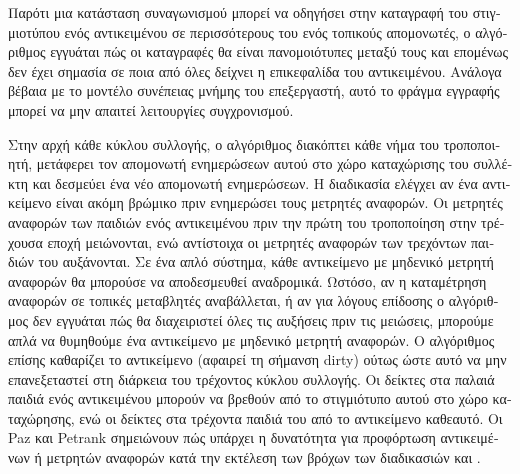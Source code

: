 \begin{greek}
Παρότι μια κατάσταση συναγωνισμού μπορεί να οδηγήσει στην
καταγραφή του στιγμιοτύπου ενός αντικειμένου σε περισσότερους
του ενός τοπικούς απομονωτές, ο αλγόριθμος εγγυάται πώς οι
καταγραφές θα είναι πανομοιότυπες μεταξύ τους και επομένως
δεν έχει σημασία σε ποια από όλες δείχνει η επικεφαλίδα του
αντικειμένου. Ανάλογα βέβαια με το μοντέλο συνέπειας μνήμης
του επεξεργαστή, αυτό το φράγμα εγγραφής μπορεί να μην απαιτεί
λειτουργίες συγχρονισμού.

Στην αρχή κάθε κύκλου συλλογής, ο αλγόριθμος διακόπτει κάθε
νήμα του τροποποιητή, μετάφερει τον απομονωτή ενημερώσεων
αυτού στο χώρο καταχώρισης του συλλέκτη και δεσμεύει ένα νέο
απομονωτή ενημερώσεων. Η διαδικασία 
ελέγχει αν ένα αντικείμενο είναι ακόμη βρώμικο πριν ενημερώσει
τους μετρητές αναφορών. Οι μετρητές αναφορών των παιδιών ενός
αντικειμένου πριν την πρώτη του τροποποίηση στην τρέχουσα
εποχή μειώνονται, ενώ αντίστοιχα οι μετρητές αναφορών των
τρεχόντων παιδιών του αυξάνονται. Σε ένα απλό σύστημα, κάθε
αντικείμενο με μηδενικό μετρητή αναφορών θα μπορούσε να
αποδεσμευθεί αναδρομικά. Ωστόσο, αν η καταμέτρηση αναφορών
σε τοπικές μεταβλητές αναβάλλεται, ή αν για λόγους επίδοσης
ο αλγόριθμος δεν εγγυάται πώς θα διαχειριστεί όλες τις αυξήσεις
πριν τις μειώσεις, μπορούμε απλά να θυμηθούμε ένα αντικείμενο
με μηδενικό μετρητή αναφορών. Ο αλγόριθμος επίσης καθαρίζει
το αντικείμενο (αφαιρεί τη σήμανση dirty) ούτως ώστε αυτό να
μην επανεξεταστεί στη διάρκεια του τρέχοντος κύκλου συλλογής.
Οι δείκτες στα παλαιά παιδιά ενός αντικειμένου μπορούν να
βρεθούν από το στιγμιότυπο αυτού στο χώρο καταχώρησης, ενώ οι
δείκτες στα τρέχοντα παιδιά του από το αντικείμενο καθεαυτό.
Οι Paz και Petrank σημειώνουν \cite{DBLP:conf/cc/PazP07} πώς
υπάρχει η δυνατότητα για προφόρτωση αντικειμένων ή μετρητών
αναφορών κατά την εκτέλεση των βρόχων των διαδικασιών
 και .


\end{greek}
